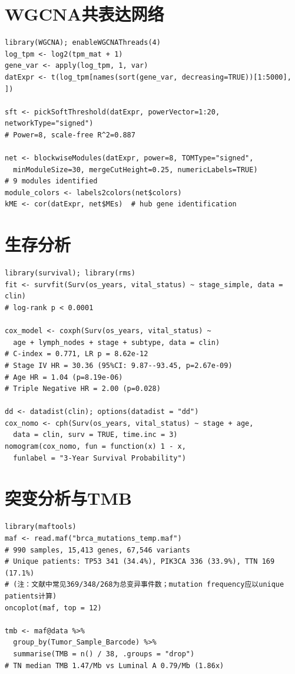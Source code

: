 \documentclass[12pt,a4paper,openany]{ctexbook}
\begin{document}
\section{WGCNA共表达网络}
\begin{lstlisting}[caption={WGCNA网络构建}, basicstyle=\ttfamily\scriptsize]
library(WGCNA); enableWGCNAThreads(4)
log_tpm <- log2(tpm_mat + 1)
gene_var <- apply(log_tpm, 1, var)
datExpr <- t(log_tpm[names(sort(gene_var, decreasing=TRUE))[1:5000], ])

sft <- pickSoftThreshold(datExpr, powerVector=1:20, networkType="signed")
# Power=8, scale-free R^2=0.887

net <- blockwiseModules(datExpr, power=8, TOMType="signed",
  minModuleSize=30, mergeCutHeight=0.25, numericLabels=TRUE)
# 9 modules identified
module_colors <- labels2colors(net$colors)
kME <- cor(datExpr, net$MEs)  # hub gene identification
\end{lstlisting}

\section{生存分析}
\begin{lstlisting}[caption={KM/Cox/Nomogram}, basicstyle=\ttfamily\scriptsize]
library(survival); library(rms)
fit <- survfit(Surv(os_years, vital_status) ~ stage_simple, data = clin)
# log-rank p < 0.0001

cox_model <- coxph(Surv(os_years, vital_status) ~
  age + lymph_nodes + stage + subtype, data = clin)
# C-index = 0.771, LR p = 8.62e-12
# Stage IV HR = 30.36 (95%CI: 9.87--93.45, p=2.67e-09)
# Age HR = 1.04 (p=8.19e-06)
# Triple Negative HR = 2.00 (p=0.028)

dd <- datadist(clin); options(datadist = "dd")
cox_nomo <- cph(Surv(os_years, vital_status) ~ stage + age,
  data = clin, surv = TRUE, time.inc = 3)
nomogram(cox_nomo, fun = function(x) 1 - x,
  funlabel = "3-Year Survival Probability")
\end{lstlisting}

\section{突变分析与TMB}
\begin{lstlisting}[caption={maftools突变分析与TMB}, basicstyle=\ttfamily\scriptsize]
library(maftools)
maf <- read.maf("brca_mutations_temp.maf")
# 990 samples, 15,413 genes, 67,546 variants
# Unique patients: TP53 341 (34.4%), PIK3CA 336 (33.9%), TTN 169 (17.1%)
# (注：文献中常见369/348/268为总变异事件数；mutation frequency应以unique patients计算)
oncoplot(maf, top = 12)

tmb <- maf@data %>%
  group_by(Tumor_Sample_Barcode) %>%
  summarise(TMB = n() / 38, .groups = "drop")
# TN median TMB 1.47/Mb vs Luminal A 0.79/Mb (1.86x)
\end{lstlisting}
\end{document}
